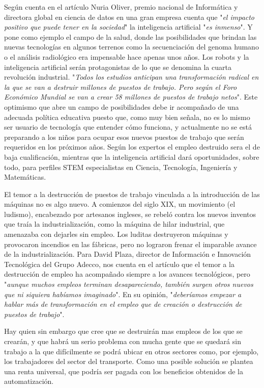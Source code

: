 \documentclass[12pt,a4paper]{article}
\begin{document}
Según cuenta en el artículo \cite{Trabajo} Nuria Oliver, premio nacional de Informática y directora global en ciencia de datos en una gran empresa cuenta que "\emph{el impacto positivo que puede tener en la sociedad}" la inteligencia artificial "\emph{es inmenso}". Y pone como ejemplo el campo de la salud, donde las posibilidades que brindan las nuevas tecnologías en algunos terrenos como la secuenciación del genoma humano o el análisis radiológico era impensable hace apenas unos años. Los robots y la inteligencia artificial serán protagonistas de lo que se denomina la cuarta revolución industrial. "\emph{Todos los estudios anticipan una transformación radical en la que se van a destruir millones de puestos de trabajo. Pero según el Foro Económico Mundial se van a crear 58 millones de puestos de trabajo netos}". Este optimismo que abre un campo de posibilidades debe ir acompañado de una adecuada política educativa puesto que, como muy bien señala, no es lo mismo ser usuario de tecnología que entender cómo funciona, y actualmente no se está preparando a los niños para ocupar esos nuevos puestos de trabajo que serán requeridos en los próximos años. Según los expertos el empleo destruido sera el de baja cualificación, mientras que la inteligencia artificial dará oportunidades, sobre todo, para perfiles STEM especialistas en Ciencia, Tecnología, Ingeniería y Matemáticas.

El temor a la destrucción de puestos de trabajo vinculada a la introducción de las máquinas no es algo nuevo. A comienzos del siglo XIX, un movimiento (el ludismo), encabezado por artesanos ingleses, se rebeló contra los nuevos inventos que traía la industrialización, como la máquina de hilar industrial, que amenazaba con dejarles sin empleo. Los luditas destruyeron máquinas y provocaron incendios en las fábricas, pero no lograron frenar el imparable avance de la industrialización. Para David Plaza, director de Información e Innovación Tecnológica del Grupo Adecco, nos cuenta en el artículo \cite{Empleo} que el temor a la destrucción de empleo ha acompañado siempre a los avances tecnológicos, pero "\emph{aunque muchos empleos terminan desapareciendo, también surgen otros nuevos que ni siquiera habíamos imaginado}". En su opinión, "\emph{deberíamos empezar a hablar más de transformación en el empleo que de creación o destrucción de puestos de trabajo}".

Hay quien sin embargo que cree que se destruirán mas empleos de los que se crearán, y que habrá un serio problema con mucha gente que se quedará sin trabajo a la que difícilmente se podrá ubicar en otros sectores como, por ejemplo, los trabajadores del sector del transporte. Como una posible solución se plantea una renta universal, que podría ser pagada con los beneficios obtenidos de la automatización.
\end{document}

